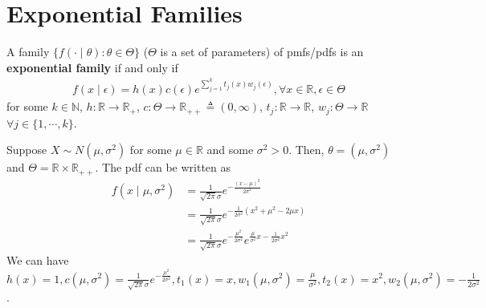 \documentclass[11pt]{elegantbook}
\begin{document}
\section{Exponential Families}
\begin{definition}
    \normalfont
    A family $\{f(\cdot\mid \theta):\theta\in\Theta\}$ ($\Theta$ is a set of parameters) of pmfs/pdfs is an \textbf{exponential family} if and only if
    \begin{equation}
        \begin{aligned}
            f(x\mid\epsilon)=h(x)c(\epsilon) e^{\sum_{j=1}^k t_j(x)w_j(\epsilon)},\forall x\in \mathbb{R}, \epsilon\in \Theta
        \end{aligned}
        \nonumber
    \end{equation}
    for some $k\in \mathbb{N}$, $h: \mathbb{R} \rightarrow \mathbb{R}_+$, $c: \Theta \rightarrow \mathbb{R}_{++}\triangleq (0,\infty)$, $t_j: \mathbb{R} \rightarrow \mathbb{R}$, $w_j: \Theta \rightarrow \mathbb{R}$ $\forall j\in\{1,\cdots,k\}$.
\end{definition}
\begin{example}[ $N(\mu,\sigma^2)$]
    Suppose $X\sim N(\mu,\sigma^2)$ for some $\mu\in \mathbb{R}$ and some $\sigma^2>0$. Then, $\theta=(\mu,\sigma^2)$ and $\Theta=\mathbb{R}\times \mathbb{R}_{++}$. The pdf can be written as
    \begin{equation}
        \begin{aligned}
            f(x\mid \mu,\sigma^2)&=\frac{1}{\sqrt{2\pi}\sigma}e^{-\frac{(x-\mu)^2}{2\sigma^2}}\\
            &=\frac{1}{\sqrt{2\pi}\sigma}e^{-\frac{1}{2\sigma^2}(x^2+\mu^2-2\mu x)}\\
            &=\frac{1}{\sqrt{2\pi}\sigma}e^{-\frac{\mu^2}{2\sigma^2}}e^{\frac{\mu}{\sigma^2}x-\frac{1}{2\sigma^2}x^2}
        \end{aligned}
        \nonumber
    \end{equation}
    We can have $h(x)=1, c(\mu,\sigma^2)=\frac{1}{\sqrt{2\pi}\sigma}e^{-\frac{\mu^2}{2\sigma^2}}, t_1(x)=x, w_1(\mu,\sigma^2)=\frac{\mu}{\sigma^2}, t_2(x)=x^2, w_2(\mu,\sigma^2)=-\frac{1}{2\sigma^2}$.
\end{example}
\end{document}
